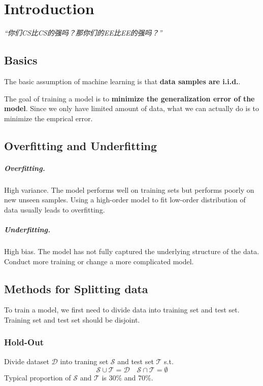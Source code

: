 \chapter{Introduction}
\emph{“你们CS比CS的强吗？那你们的EE比EE的强吗？”}
\newpage

\section{Basics}
The basic assumption of machine learning is that \textbf{data samples are i.i.d.}.

The goal of training a model is to \textbf{minimize the generalization error of the model}. Since we only have limited amount of data, what we can actually do is to minimize the emprical error.

\section{Overfitting and Underfitting}
\paragraph{Overfitting.} High variance. The model performs well on training sets but performs poorly on new unseen samples. Using a high-order model to fit low-order distribution of data usually leads to overfitting.
\paragraph{Underfitting.} High bias. The model has not fully captured the underlying structure of the data. Conduct more training or change a more complicated model.

\section{Methods for Splitting data}
To train a model, we first need to divide data into training set and test set. Training set and test set should be disjoint.

\subsection{Hold-Out}
Divide dataset $\mathcal{D}$ into traning set $\mathcal{S}$ and test set $\mathcal{T}$ s.t.
\[ \mathcal{S} \cup \mathcal{T} = \mathcal{D} \quad \mathcal{S} \cap \mathcal{T} = \emptyset \]
Typical proportion of $\mathcal{S}$ and $\mathcal{T}$ is 30\% and 70\%.

